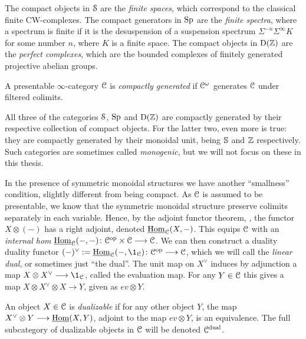 \begin{example}
    The compact objects in $\Spaces$ are the \emph{finite spaces}, which correspond to the classical finite CW-complexes. The compact generators in $\Sp$ are the \emph{finite spectra}, where a spectrum is finite if it is the desuspension of a suspension spectrum $\Sigma^{-n}\Sigma^\infty K$ for some number $n$, where $K$ is a finite space. The compact objects in $\Der(\Z)$ are the \emph{perfect complexes}, which are the bounded complexes of finitely generated projective abelian groups. 
\end{example}

\begin{definition}
    \label{ch0:def:compactly-generated-category}
    A presentable $\infty$-category $\C$ is \emph{compactly generated} if $\Co$ generates $\C$ under filtered colimits. 
\end{definition}

All three of the categories $\Spaces$, $\Sp$ and $\Der(\Z)$ are compactly generated by their respective collection of compact objects. For the latter two, even more is true: they are compactly generated by their monoidal unit, being $\S$ and $\Z$ respectively. Such categories are sometimes called \emph{monogenic}, but we will not focus on these in this thesis. 

In the presence of symmetric monoidal structures we have another ``smallness'' condition, slightly different from being compact. As $\C$ is assumed to be presentable, we know that the symmetric monoidal structure preserve colimits separately in each variable. Hence, by the adjoint functor theorem, \cite[5.5.2.9]{lurie_09}, the functor $X\otimes (-)$ has a right adjoint, denoted $\iHom_\C(X,-)$. This equips $\C$ with an \emph{internal hom} $\iHom_\C(-,-)\: \C\op\times \C\to \C$. We can then construct a duality duality functor $(-)^\vee:=\iHom_\C(-,\1_\C)\: \C\op \to \C$, which we will call the \emph{linear dual}, or sometimes just ``the dual''. The unit map on $X^\vee$ induces by adjunction a map $X\otimes X^\vee \to \1_\C$, called the evaluation map. For any $Y\in \C$ this gives a map $X\otimes X^\vee \otimes X\to Y$, given as $ev \otimes Y$. 

\begin{definition}
    \label{ch0:def:dualizable-object}
    An object $X\in \C$ is \emph{dualizable} if for any other object $Y$, the map $X^\vee\otimes Y\to \iHom(X,Y)$, adjoint to the map $ev\otimes Y$, is an equivalence. The full subcategory of dualizable objects in $\C$ will be denoted $\C\dual$. 
\end{definition}

